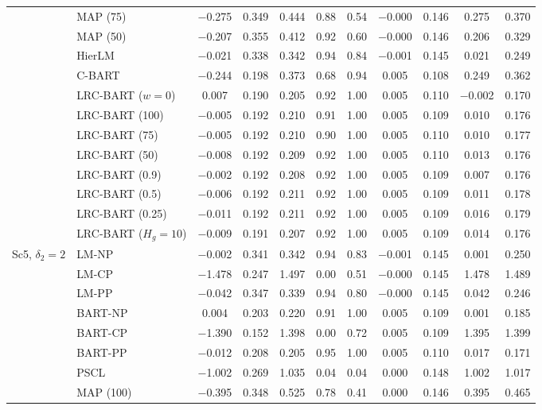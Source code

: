 \documentclass[11pt]{article}
\theoremstyle{definition}
\theoremstyle{plain}
\begin{document}
\begin{center}
\begin{longtable}{llccccccccc}
& MAP (75) & $-$0.275 & 0.349 & 0.444 & 0.88 & 0.54 & $-$0.000 & 0.146 & 0.275 & 0.370 \\
& MAP (50) & $-$0.207 & 0.355 & 0.412 & 0.92 & 0.60 & $-$0.000 & 0.146 & 0.206 & 0.329 \\
& HierLM & $-$0.021 & 0.338 & 0.342 & 0.94 & 0.84 & $-$0.001 & 0.145 & 0.021 & 0.249 \\
& C-BART & $-$0.244 & 0.198 & 0.373 & 0.68 & 0.94 & 0.005 & 0.108 & 0.249 & 0.362 \\
& LRC-BART ($w=0$) & 0.007 & 0.190 & 0.205 & 0.92 & 1.00 & 0.005 & 0.110 & $-$0.002 & 0.170 \\
& LRC-BART (100) & $-$0.005 & 0.192 & 0.210 & 0.91 & 1.00 & 0.005 & 0.109 & 0.010 & 0.176 \\
& LRC-BART (75) & $-$0.005 & 0.192 & 0.210 & 0.90 & 1.00 & 0.005 & 0.110 & 0.010 & 0.177 \\
& LRC-BART (50) & $-$0.008 & 0.192 & 0.209 & 0.92 & 1.00 & 0.005 & 0.110 & 0.013 & 0.176 \\
& LRC-BART (0.9) & $-$0.002 & 0.192 & 0.208 & 0.92 & 1.00 & 0.005 & 0.109 & 0.007 & 0.176 \\
& LRC-BART (0.5) & $-$0.006 & 0.192 & 0.211 & 0.92 & 1.00 & 0.005 & 0.109 & 0.011 & 0.178 \\
& LRC-BART (0.25) & $-$0.011 & 0.192 & 0.211 & 0.92 & 1.00 & 0.005 & 0.109 & 0.016 & 0.179 \\
& LRC-BART ($H_g=10$) & $-$0.009 & 0.191 & 0.207 & 0.92 & 1.00 & 0.005 & 0.109 & 0.014 & 0.176 \\
\midrule
\multirow{20}{*}{Sc5, $\delta_2=2$} & LM-NP & $-$0.002 & 0.341 & 0.342 & 0.94 & 0.83 & $-$0.001 & 0.145 & 0.001 & 0.250 \\
& LM-CP & $-$1.478 & 0.247 & 1.497 & 0.00 & 0.51 & $-$0.000 & 0.145 & 1.478 & 1.489 \\
& LM-PP & $-$0.042 & 0.347 & 0.339 & 0.94 & 0.80 & $-$0.000 & 0.145 & 0.042 & 0.246 \\
& BART-NP & 0.004 & 0.203 & 0.220 & 0.91 & 1.00 & 0.005 & 0.109 & 0.001 & 0.185 \\
& BART-CP & $-$1.390 & 0.152 & 1.398 & 0.00 & 0.72 & 0.005 & 0.109 & 1.395 & 1.399 \\
& BART-PP & $-$0.012 & 0.208 & 0.205 & 0.95 & 1.00 & 0.005 & 0.110 & 0.017 & 0.171 \\
& PSCL & $-$1.002 & 0.269 & 1.035 & 0.04 & 0.04 & 0.000 & 0.148 & 1.002 & 1.017 \\
& MAP (100) & $-$0.395 & 0.348 & 0.525 & 0.78 & 0.41 & 0.000 & 0.146 & 0.395 & 0.465 \\

\end{longtable}
\end{center}
\end{document}
